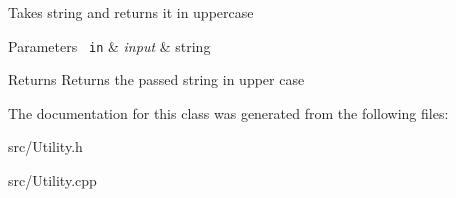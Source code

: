 Takes string and returns it in uppercase 
\begin{DoxyParams}[1]{Parameters}
\mbox{\texttt{ in}}  & {\em input} & string \\
\hline
\end{DoxyParams}
\begin{DoxyReturn}{Returns}
Returns the passed string in upper case 
\end{DoxyReturn}


The documentation for this class was generated from the following files\+:\begin{DoxyCompactItemize}
\item 
src/Utility.\+h\item 
src/Utility.\+cpp\end{DoxyCompactItemize}
